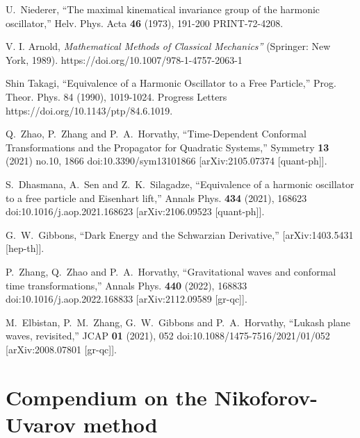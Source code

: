 \documentclass[preprint,showpacs,preprintnumbers,amsmath,amssymb,nofootinbib]{revtex4}
\begin{document}
\begin{thebibliography}{99}
U.~Niederer,
``The maximal kinematical invariance group of the harmonic oscillator,''
Helv. Phys. Acta \textbf{46} (1973), 191-200
PRINT-72-4208.

 V. I. Arnold, {\sl Mathematical Methods of Classical Mechanics''} (Springer:
New York, 1989). https://doi.org/10.1007/978-1-4757-2063-1

Shin Takagi, 
``Equivalence of a Harmonic Oscillator to a Free Particle,'' Prog. Theor. Phys. 84 (1990), 1019-1024. 
Progress Letters https://doi.org/10.1143/ptp/84.6.1019.


Q.~Zhao, P.~Zhang and P.~A.~Horvathy,
``Time-Dependent Conformal Transformations and the Propagator for Quadratic Systems,''
Symmetry \textbf{13} (2021) no.10, 1866
doi:10.3390/sym13101866
[arXiv:2105.07374 [quant-ph]].

S.~Dhasmana, A.~Sen and Z.~K.~Silagadze,
``Equivalence of a harmonic oscillator to a free particle and Eisenhart lift,''
Annals Phys. \textbf{434} (2021), 168623
doi:10.1016/j.aop.2021.168623
[arXiv:2106.09523 [quant-ph]].

G.~W.~Gibbons,
``Dark Energy and the Schwarzian Derivative,''
[arXiv:1403.5431 [hep-th]].

P.~Zhang, Q.~Zhao and P.~A.~Horvathy,
``Gravitational waves and conformal time transformations,''
Annals Phys. \textbf{440} (2022), 168833
doi:10.1016/j.aop.2022.168833
[arXiv:2112.09589 [gr-qc]]. 

M.~Elbistan, P.~M.~Zhang, G.~W.~Gibbons and P.~A.~Horvathy,
``Lukash plane waves, revisited,''
JCAP \textbf{01} (2021), 052
doi:10.1088/1475-7516/2021/01/052
[arXiv:2008.07801 [gr-qc]].

\end{thebibliography}

\appendix
\section{\bf Compendium on the Nikoforov-Uvarov method
}\label{Appendix}
\end{document}
